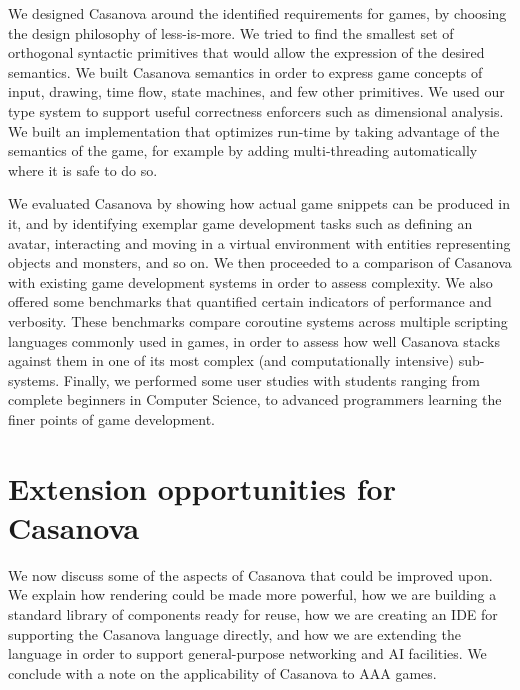 We designed Casanova around the identified requirements for games, by choosing the design philosophy of less-is-more. We tried to find the smallest set of orthogonal syntactic primitives that would allow the expression of the desired semantics. We built Casanova semantics in order to express game concepts of input, drawing, time flow, state machines, and few other primitives. We used our type system to support useful correctness enforcers such as dimensional analysis. We built an implementation that optimizes run-time by taking advantage of the semantics of the game, for example by adding multi-threading automatically where it is safe to do so.

We evaluated Casanova by showing how actual game snippets can be produced in it, and by identifying exemplar game development tasks such as defining an avatar, interacting and moving in a virtual environment with entities representing objects and monsters, and so on. We then proceeded to a comparison of Casanova with existing game development systems in order to assess complexity. We also offered some benchmarks that quantified certain indicators of performance and verbosity. These benchmarks compare coroutine systems across multiple scripting languages commonly used in games, in order to assess how well Casanova stacks against them in one of its most complex (and computationally intensive) sub-systems. Finally, we performed some user studies with students ranging from complete beginners in Computer Science, to advanced programmers learning the finer points of game development.

\section{Extension opportunities for Casanova}
We now discuss some of the aspects of Casanova that could be improved upon. We explain how rendering could be made more powerful, how we are building a standard library of components ready for reuse, how we are creating an IDE for supporting the Casanova language directly, and how we are extending the language in order to support general-purpose networking and AI facilities. We conclude with a note on the applicability of Casanova to AAA games.

